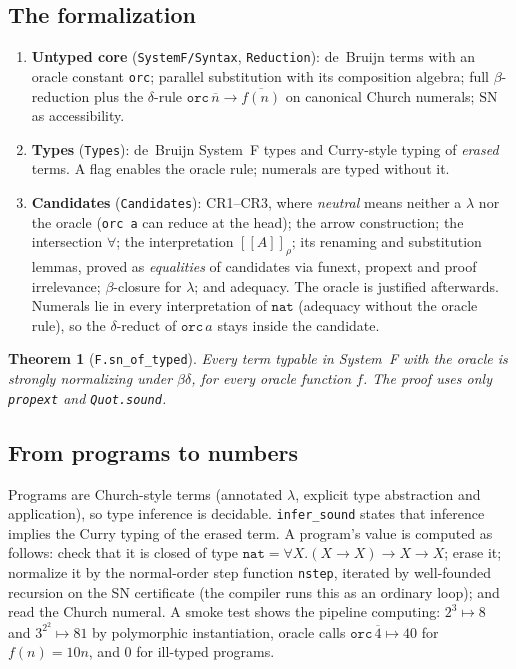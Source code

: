 \documentclass[11pt]{article}
\newtheorem{theorem}{Theorem}
\theoremstyle{definition}
\theoremstyle{remark}
\providecommand{\llbracket}{[\![}
\providecommand{\rrbracket}{]\!]}
\newcommand{\lean}[1]{\texttt{#1}}
\begin{document}
\subsection{The formalization}
\begin{enumerate}[leftmargin=*]
\item \textbf{Untyped core} (\lean{SystemF/Syntax}, \lean{Reduction}): de~Bruijn
  terms with an oracle constant \lean{orc}; parallel substitution with its
  composition algebra; full $\beta$-reduction plus the $\delta$-rule
  $\mathtt{orc}\,\overline{n}\to\overline{f(n)}$ on canonical Church numerals;
  $\mathrm{SN}$ as accessibility.
\item \textbf{Types} (\lean{Types}): de~Bruijn System~F types and Curry-style
  typing of \emph{erased} terms. A flag enables the oracle rule; numerals are
  typed without it.
\item \textbf{Candidates} (\lean{Candidates}): CR1--CR3, where \emph{neutral}
  means neither a $\lambda$ nor the oracle (\lean{orc a} can reduce at the
  head); the arrow construction; the intersection $\forall$; the interpretation
  $\llbracket A\rrbracket_\rho$; its renaming and substitution lemmas, proved as
  \emph{equalities} of candidates via funext, propext and proof irrelevance;
  $\beta$-closure for $\lambda$; and adequacy.
  The oracle is justified afterwards. Numerals lie in every interpretation of
  $\mathtt{nat}$ (adequacy without the oracle rule), so the $\delta$-reduct of
  $\mathtt{orc}\,a$ stays inside the candidate.
\end{enumerate}
\begin{theorem}[\lean{F.sn\_of\_typed}]
Every term typable in System~F with the oracle is strongly normalizing under
$\beta\delta$, for every oracle function $f$. The proof uses only \lean{propext}
and \lean{Quot.sound}.
\end{theorem}

\subsection{From programs to numbers}
Programs are Church-style terms (annotated $\lambda$, explicit type abstraction
and application), so type inference is decidable. \lean{infer\_sound} states
that inference implies the Curry typing of the erased term. A program's value
is computed as follows: check that it is closed of type
$\mathtt{nat}=\forall X.(X\to X)\to X\to X$; erase it; normalize it by the
normal-order step function \lean{nstep}, iterated by well-founded recursion on
the SN certificate (the compiler runs this as an ordinary loop); and read the
Church numeral. A smoke test shows the pipeline computing:
$2^3\mapsto 8$ and $3^{2^2}\mapsto 81$ by polymorphic instantiation, oracle
calls $\mathtt{orc}\,\overline{4}\mapsto 40$ for $f(n)=10n$, and $0$ for
ill-typed programs.
\end{document}
